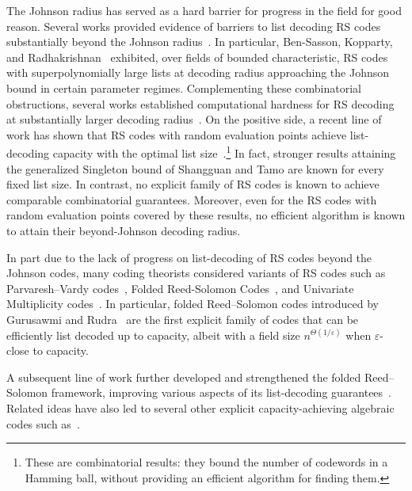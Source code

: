 \documentclass[11pt]{article}
\newcommand{\eps}{\varepsilon}
\begin{document}
The Johnson radius has served as a hard barrier for progress in the field for good reason. Several works provided evidence of barriers to list decoding RS codes substantially beyond the Johnson radius~\cite{RR03,GR06,CW07,BKR10}. In particular, Ben-Sasson, Kopparty, and Radhakrishnan~\cite{BKR10} exhibited, over fields of bounded characteristic, RS codes with superpolynomially large lists at decoding radius approaching the Johnson bound in certain parameter regimes. Complementing these combinatorial obstructions, several works established computational hardness for RS decoding at substantially larger decoding radius~\cite{GV05,CW07,GGG18}. On the positive side, a recent line of work has shown that RS codes with random evaluation points achieve list-decoding capacity with the optimal list size~\cite{RudraWootters2015,ShangguanTamo2023,GuoLiShangguanTamoWootters2021,GoldbergShangguanTamo2023,BrakensiekGopiMakam2024,GuoZhang2023,AlrabiahGuruswamiLi2024,AlrabiahGuoGuruswamiLiZhang2025}.\footnote{These are combinatorial results: they bound the number of codewords in a Hamming ball, without providing an efficient algorithm for finding them.} In fact, stronger results \cite{BrakensiekGopiMakam2024,GuoZhang2023,AlrabiahGuruswamiLi2024,AlrabiahGuoGuruswamiLiZhang2025} attaining the generalized Singleton bound of Shangguan and Tamo \cite{ShangguanTamo2023} are known for every fixed list size. In contrast, no explicit family of RS codes is known to achieve comparable combinatorial guarantees. Moreover, even for the RS codes  with random evaluation points covered by these results, no efficient algorithm is known to attain their beyond-Johnson decoding radius.

In part due to the lack of progress on list-decoding of RS codes beyond the Johnson codes, many coding theorists considered variants of RS codes such as Parvaresh--Vardy codes~\cite{parvaresh2005correcting}, Folded Reed-Solomon Codes~\cite{GuruswamiRudra2008}, and Univariate Multiplicity codes~\cite{kopparty2014multiplicity}. In particular, folded Reed--Solomon codes introduced by Gurusawmi and Rudra~\cite{GuruswamiRudra2008} are the first explicit family of codes that can be efficiently list decoded up to capacity, albeit with a field size $n^{\Theta(1/\eps)}$ when $\eps$-close to capacity.

A subsequent line of work further developed and strengthened the folded Reed--Solomon framework, improving various aspects of its list-decoding guarantees~\cite{GuruswamiWang2013,Kopparty2015,KoppartyRonZewiSarafWootters2023,GHKS24,srivastava2025improved,chen2025explicit,ashvinkumar2026algorithmic}. Related ideas have also led to several other explicit capacity-achieving algebraic codes such as~\cite{GRZ21,GX22}. 
\end{document}
